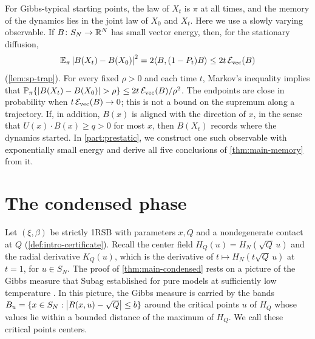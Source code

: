 For Gibbs-typical starting points, the law of $X_t$ is $\pi$ at all times, and the memory of the dynamics lies in the joint law of $X_0$ and $X_t$. Here we use a slowly varying observable. If $B\colon S_N\to\mathbb R^N$ has small vector energy, then, for the stationary diffusion,
\begin{equation}\label{eq:ov-endpoint-energy}
\mathbb E_\pi\left|B(X_t)-B(X_0)\right|^2=2\langle B,(1-P_t)B\rangle\le2t\,\mathcal E_{\rm vec}(B)
\end{equation}
(\cref{lem:sp-trap}). For every fixed $\rho>0$ and each time $t$, Markov's inequality implies that $\Pp_\pi\{\abs{B(X_t)-B(X_0)}>\rho\}\le2t\,\cE_{\rm vec}(B)/\rho^2$. The endpoints are close in probability when $t\,\mathcal E_{\rm vec}(B)\to0$; this is not a bound on the supremum along a trajectory. If, in addition, $B(x)$ is aligned with the direction of $x$, in the sense that $U(x)\cdot B(x)\ge q>0$ for most $x$, then $B(X_t)$ records where the dynamics started. In \cref{part:prestatic}, we construct one such observable with exponentially small energy and derive all five conclusions of \cref{thm:main-memory} from it.

\section{The condensed phase}\label{sec:ov-condensed}

Let $(\xi,\beta)$ be strictly 1RSB with parameters $x,Q$ and a nondegenerate contact at $Q$ (\cref{def:intro-certificate}). Recall the center field $H_Q(u)=H_N(\sqrt Q\,u)$ and the radial derivative $K_Q(u)$, which is the derivative of $t\mapsto H_N(t\sqrt Q\,u)$ at $t=1$, for $u\in S_N$. The proof of \cref{thm:main-condensed} rests on a picture of the Gibbs measure that Subag established for pure models at sufficiently low temperature \cite{Subag2017geometry}. In this picture, the Gibbs measure is carried by the bands $B_u=\{x\in S_N:\left|R(x,u)-\sqrt Q\right|\le b\}$ around the critical points $u$ of $H_Q$ whose values lie within a bounded distance of the maximum of $H_Q$. We call these critical points centers.

